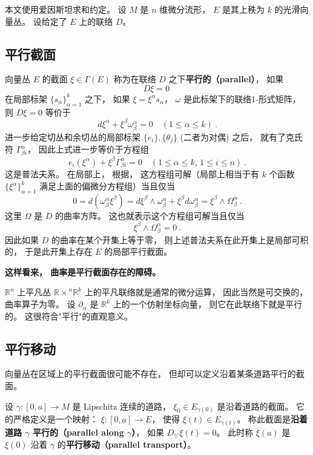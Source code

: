 

本文使用爱因斯坦求和约定。 设 $M$ 是 $n$ 维微分流形， $E$ 是其上秩为 $k$ 的光滑向量丛。 设给定了 $E$ 上的联络 $D$。

\subsection{平行截面}

向量丛 $E$ 的截面 $\xi\in\Gamma(E)$ 称为在联络 $D$ 之下\textbf{平行的（parallel）}， 如果
$$D\xi=0~$$
在局部标架 $\{s_\alpha\}_{\alpha=1}^k$ 之下， 如果 $\xi=\xi^\alpha s_\alpha$， $\omega$ 是此标架下的联络1-形式矩阵， 则 $D\xi=0$ 等价于
$$
d\xi^\alpha+\xi^\beta\omega^\alpha_\beta=0 \quad(1\leq \alpha\leq k)~.
$$
进一步给定切丛和余切丛的局部标架 $\{e_i\},\{\theta_j\}$ (二者为对偶) 之后， 就有了克氏符 $\Gamma_{\beta i}^\alpha$， 因此上式进一步等价于方程组
$$
e_i(\xi^\alpha)+\xi^\beta\Gamma^\alpha_{\beta i}=0\quad (1\leq \alpha\leq k,\,1\leq i\leq n)~.
$$
这是普法夫系。 在局部上， 根据， 这方程组可解（局部上相当于有 $k$ 个函数 $\{\xi^\alpha\}_{\alpha=1}^k$ 满足上面的偏微分方程组）当且仅当
$$
0=d(\omega^\alpha_\beta\xi^\beta)=d\xi^\beta\wedge\omega^\alpha_\beta+\xi^\beta d\omega^\alpha_\beta=\xi^\beta\wedge\Omega_\beta^\alpha~.
$$
这里 $\Omega$ 是 $D$ 的曲率方阵。 这也就表示这个方程组可解当且仅当
$$
\xi^\beta\wedge\Omega_\beta^\alpha=0~.
$$
因此如果 $D$ 的曲率在某个开集上等于零， 则上述普法夫系在此开集上是局部可积的， 于是此开集上存在 $E$ 的局部平行截面。

\textbf{这样看来， 曲率是平行截面存在的障碍。}

$\mathbb{R}^n$ 上平凡丛 $\mathbb{R\times}^n\mathbb{R}^k$ 上的平凡联络就是通常的微分运算， 因此当然是可交换的， 曲率算子为零。 设 $\partial_\alpha$ 是 $\mathbb{R}^k$ 上的一个仿射坐标向量， 则它在此联络下就是平行的。 这很符合"平行"的直观意义。 

\subsection{平行移动}
向量丛在区域上的平行截面很可能不存在， 但却可以定义沿着某条道路平行的截面。 

设 $\gamma:[0,a]\to M$ 是 Lipschitz 连续的道路， $\xi_0\in E_{\gamma(0)}$ 是沿着道路的截面。 它的严格定义是一个映射： $\xi:[0,a]\to E$， 使得 $\xi(t)\in E_{\gamma(t)}$。 称此截面是\textbf{沿着道路 $\gamma$ 平行的（parallel along $\gamma$）}， 如果 $D_{\gamma'}\xi(t)=0$。 此时称 $\xi(a)$ 是 $\xi(0)$ 沿着 $\gamma$ 的\textbf{平行移动（parallel transport）}。

